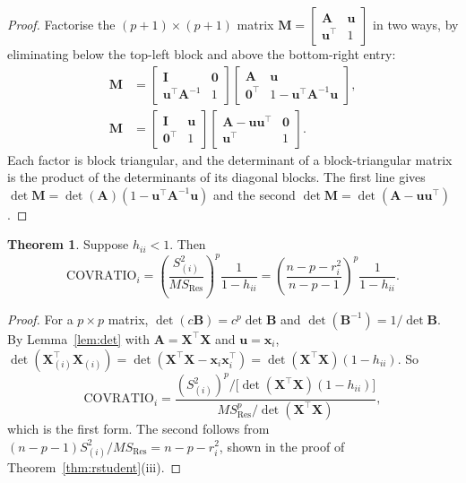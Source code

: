 \documentclass[11pt,a4paper]{article}
\numberwithin{equation}{section}
\theoremstyle{definition}
\newtheorem{thm}{Theorem}[subsection]
\begin{document}
\begin{proof}
Factorise the $(p + 1) \times (p + 1)$ matrix
$\mathbf{M} = \begin{bmatrix} \mathbf{A} & \mathbf{u} \\ \mathbf{u}^\top & 1 \end{bmatrix}$ in two
ways, by eliminating below the top-left block and above the bottom-right entry:
\begin{align*}
\mathbf{M} &= \begin{bmatrix} \mathbf{I} & \mathbf{0} \\ \mathbf{u}^\top\mathbf{A}^{-1} & 1 \end{bmatrix}
\begin{bmatrix} \mathbf{A} & \mathbf{u} \\ \mathbf{0}^\top & 1 - \mathbf{u}^\top\mathbf{A}^{-1}\mathbf{u} \end{bmatrix} , \\
\mathbf{M} &= \begin{bmatrix} \mathbf{I} & \mathbf{u} \\ \mathbf{0}^\top & 1 \end{bmatrix}
\begin{bmatrix} \mathbf{A} - \mathbf{u}\mathbf{u}^\top & \mathbf{0} \\ \mathbf{u}^\top & 1 \end{bmatrix} .
\end{align*}
Each factor is block triangular, and the determinant of a block-triangular matrix is the
product of the determinants of its diagonal blocks. The first line gives
$\det\mathbf{M} = \det(\mathbf{A})(1 - \mathbf{u}^\top\mathbf{A}^{-1}\mathbf{u})$ and the second
$\det\mathbf{M} = \det(\mathbf{A} - \mathbf{u}\mathbf{u}^\top)$.
\end{proof}

\begin{thm}\label{thm:covratio}
Suppose $h_{ii} < 1$. Then
\[
\mathrm{COVRATIO}_i = \left(\frac{S^2_{(i)}}{MS_{\mathrm{Res}}}\right)^p\frac{1}{1 - h_{ii}}
= \left(\frac{n - p - r_i^2}{n - p - 1}\right)^p\frac{1}{1 - h_{ii}} .
\]
\end{thm}

\begin{proof}
For a $p \times p$ matrix, $\det(c\mathbf{B}) = c^p\det\mathbf{B}$ and
$\det(\mathbf{B}^{-1}) = 1/\det\mathbf{B}$. By Lemma~\ref{lem:det} with
$\mathbf{A} = \mathbf{X}^\top\mathbf{X}$ and $\mathbf{u} = \mathbf{x}_i$,
$\det(\mathbf{X}_{(i)}^\top\mathbf{X}_{(i)}) = \det(\mathbf{X}^\top\mathbf{X} - \mathbf{x}_i\mathbf{x}_i^\top) = \det(\mathbf{X}^\top\mathbf{X})(1 - h_{ii})$.
So
\[
\mathrm{COVRATIO}_i = \frac{(S^2_{(i)})^p\big/\bigl[\det(\mathbf{X}^\top\mathbf{X})(1 - h_{ii})\bigr]}{MS_{\mathrm{Res}}^p\big/\det(\mathbf{X}^\top\mathbf{X})} ,
\]
which is the first form. The second follows from
$(n - p - 1)S^2_{(i)}/MS_{\mathrm{Res}} = n - p - r_i^2$, shown in the proof of
Theorem~\ref{thm:rstudent}(iii).
\end{proof}
\end{document}
